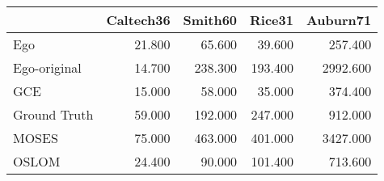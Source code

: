 \begin{tabular}{lrrrr}
\toprule
{} & Caltech36 & Smith60 &  Rice31 & Auburn71 \\
\midrule
Ego          &    21.800 &  65.600 &  39.600 &  257.400 \\
Ego-original &    14.700 & 238.300 & 193.400 & 2992.600 \\
GCE          &    15.000 &  58.000 &  35.000 &  374.400 \\
Ground Truth &    59.000 & 192.000 & 247.000 &  912.000 \\
MOSES        &    75.000 & 463.000 & 401.000 & 3427.000 \\
OSLOM        &    24.400 &  90.000 & 101.400 &  713.600 \\
\bottomrule
\end{tabular}
